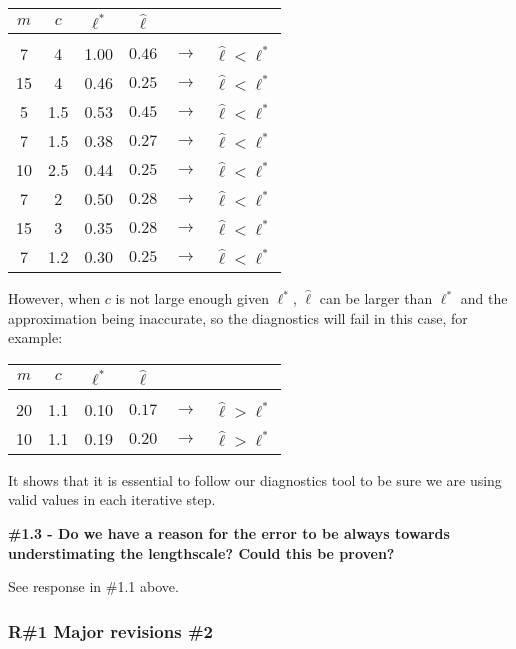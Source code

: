 \documentclass[11pt]{report}
\begin{document}
\begin{table}[h]
\centering
\begin{tabular}{ c c c c c c }
$m$ & $c$ & $\ell^*$ & $\hat{\ell}$ & \\ 
\hline \\[-4mm]
7  & 4   & 1.00 & $0.46$ & $\to$ & $\hat{\ell} < \ell^*$ \\
15 & 4   & 0.46 & $0.25$ & $\to$ & $\hat{\ell} < \ell^*$ \\
5  & 1.5 & 0.53 & $0.45$ & $\to$ & $\hat{\ell} < \ell^*$ \\
7  & 1.5 & 0.38 & $0.27$ & $\to$ & $\hat{\ell} < \ell^*$ \\
10 & 2.5 & 0.44 & $0.25$ & $\to$ & $\hat{\ell} < \ell^*$ \\
7  & 2   & 0.50 & $0.28$ & $\to$ & $\hat{\ell} < \ell^*$ \\
15 & 3   & 0.35 & $0.28$ & $\to$ & $\hat{\ell} < \ell^*$ \\
7  & 1.2 & 0.30 & $0.25$ & $\to$ & $\hat{\ell} < \ell^*$ \\
\end{tabular}
\end{table}

However, when $c$ is not large enough given $\ell^*$, $\hat{\ell}$ can be larger than $\ell^*$ and the approximation being inaccurate, so the diagnostics will fail in this case, for example:

\begin{table}[h]
\centering
\begin{tabular}{ c c c c c c }
$m$ & $c$ & $\ell^*$ & $\hat{\ell}$ & \\ 
\hline \\[-4mm]
20 & 1.1 & 0.10 & $0.17$ & $\to$ & $\hat{\ell} > \ell^*$ \\
10 & 1.1 & 0.19 & $0.20$ & $\to$ & $\hat{\ell} > \ell^*$ \\
\end{tabular}
\end{table}

It shows that it is essential to follow our diagnostics tool to be sure we are using valid values in each iterative step.

\textbf{\#1.3 - Do we have a reason for the error to be always towards understimating the lengthscale? Could this be proven?}

See response in \#1.1 above.


\subsubsection*{R\#1 Major revisions \#2}
\end{document}
